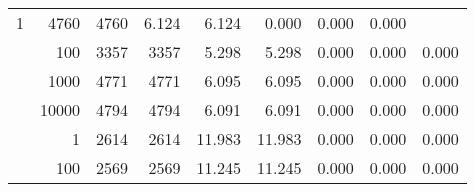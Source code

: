 \begin{table}
\begin{tabular}{rrrrrrrrr}
					\multirow{ 1 }{*}{ 1 } &
					
						
							    
							     4760  & 4760  
	                           & 6.124 & 6.124 & 0.000
	                           & 0.000 & 0.000  \\
	                
	            
					 &  
					 
					\multirow{ 1 }{*}{ 100 } &
					
						
							    
							     3357  & 3357  
	                           & 5.298 & 5.298 & 0.000
	                           & 0.000 & 0.000  \\
	                
	            
					 &  
					 
					\multirow{ 1 }{*}{ 1000 } &
					
						
							    
							     4771  & 4771  
	                           & 6.095 & 6.095 & 0.000
	                           & 0.000 & 0.000  \\
	                
	            
					 &  
					 
					\multirow{ 1 }{*}{ 10000 } &
					
						
							    
							     4794  & 4794  
	                           & 6.091 & 6.091 & 0.000
	                           & 0.000 & 0.000  \\
	                
	            
	        
				\noalign{\smallskip}\hline
				\multirow{ 4 }{*}{ 2000000 } &
				
					
					 
					\multirow{ 1 }{*}{ 1 } &
					
						
							    
							     2614  & 2614  
	                           & 11.983 & 11.983 & 0.000
	                           & 0.000 & 0.000  \\
	                
	            
					 &  
					 
					\multirow{ 1 }{*}{ 100 } &
					
						
							    
							     2569  & 2569  
	                           & 11.245 & 11.245 & 0.000
	                           & 0.000 & 0.000  \\
	                

\end{tabular}
\end{table}
